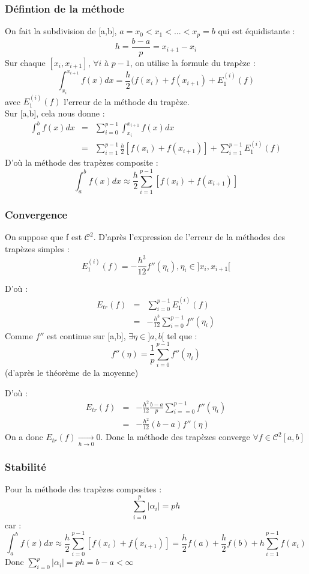 \subsubsection{Défintion de la méthode}
On fait la subdivision de [a,b], $a=x_0<x_1<...<x_p=b$ qui est équidistante : 
\[h=\frac{b-a}{p}=x_{i+1}-x_i\]
Sur chaque $[x_i,x_{i+1}]$, $\forall i$ à $p-1$, on utilise la formule du trapèze : 
\[\int_{x_i}^{x_{i+1}} f(x) dx = \frac{h}{2}(f(x_i)+ f(x_{i+1})+E_1^{(i)}(f)\]
avec $E_1^{(i)}(f)$ l'erreur de la méthode du trapèze. \\
Sur [a,b], cela nous donne : 
\begin{eqnarray*}
	\int_a^b f(x) dx &=& \sum_{i=0}^{p-1} \int_{x_i}^{x_{i+1}} f(x) dx \\
			 &=& \sum_{i=1}^{p-1} \frac{h}{2} [f(x_i) + f(x_{i+1})]+\sum_{i=1}^{p-1} E_1^{(i)}(f)
\end{eqnarray*}
D'où la méthode des trapèzes composite : 
\[\int_a^b f(x) dx \approx \frac{h}{2} \sum_{i=1}^{p-1} [f(x_i) + f(x_{i+1})] \]

\subsubsection{Convergence}
On suppose que f est $\mathcal{C}^2$.
D'après l'expression de l'erreur de la méthodes des trapèzes simples : 
\[E_1^{(i)}(f)=-\frac{h^3}{12} f''(\eta_i), \eta_i\in]x_i,x_{i+1}[ \]

D'où :
\begin{eqnarray*}
	E_{tr}(f)&=&\sum_{i=0}^{p-1} E_1^{(i)}(f) \\
		&=& -\frac{h^3}{12} \sum_{i=0}^{p-1} f''(\eta_i)
\end{eqnarray*}
Comme $f''$ est continue sur [a,b], $\exists \eta\in]a,b[$ tel que :
	\[f''(\eta) = \frac{1}{p} \sum_{i=0}^{p-1} f''(\eta_i)\]
(d'après le théorème de la moyenne)

D'où :
\begin{eqnarray*}
	E_{tr}(f)&=&-\frac{h^2}{12} \frac{b-a}{p} \sum_{i==0}^{p-1} f''(\eta_i) \\
			       &=&-\frac{h^2}{12}(b-a)f''(\eta)
\end{eqnarray*}
On a donc $E_{tr}(f)\xrightarrow[h\to 0]{}0$. Donc la méthode des trapèzes converge $\forall f\in \mathcal{C}^2[a,b]$

\subsubsection{Stabilité}
Pour la méthode des trapèzes composites : 
\[\sum_{i=0}^p |\alpha_i| = ph\]
car : 
\[\int_a^b f(x)dx \approx \frac{h}{2} \sum_{i=0}^{p-1}[f(x_i)+f(x_{i+1})]=\frac{h}{2}f(a)+\frac{h}{2}f(b)+h\sum_{i=1}^{p-1}f(x_i)\]
Donc $\sum_{i=0}^p |\alpha_i| = ph = b-a < \infty$

